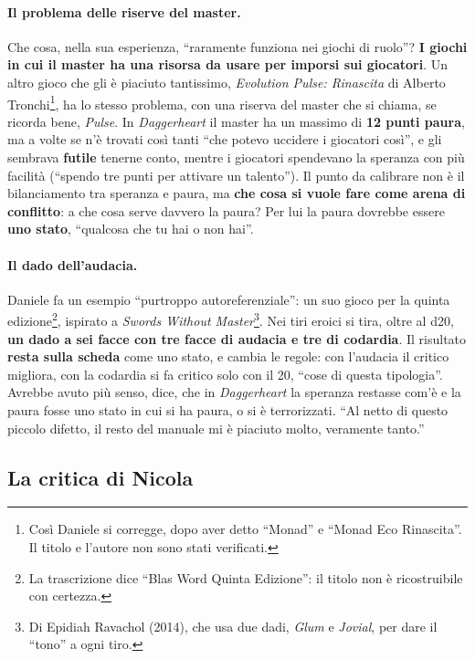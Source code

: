 \paragraph{Il problema delle riserve del master.} Che cosa, nella sua esperienza, ``raramente funziona
nei giochi di ruolo''? \textbf{I giochi in cui il master ha una risorsa da usare per imporsi sui
giocatori}. Un altro gioco che gli è piaciuto tantissimo, \emph{Evolution Pulse: Rinascita} di Alberto
Tronchi\footnote{Così Daniele si corregge, dopo aver detto ``Monad'' e ``Monad Eco Rinascita''. Il titolo
e l'autore non sono stati verificati.}, ha lo stesso problema, con una riserva del master che si chiama,
se ricorda bene, \emph{Pulse}. In \emph{Daggerheart} il master ha un massimo di \textbf{12 punti
paura}, ma a volte se n'è trovati così tanti ``che potevo uccidere i giocatori così'', e gli sembrava
\textbf{futile} tenerne conto, mentre i giocatori spendevano la speranza con più facilità (``spendo tre
punti per attivare un talento''). Il punto da calibrare non è il bilanciamento tra speranza e paura, ma
\textbf{che cosa si vuole fare come arena di conflitto}: a che cosa serve davvero la paura? Per lui la
paura dovrebbe essere \textbf{uno stato}, ``qualcosa che tu hai o non hai''.

\paragraph{Il dado dell'audacia.} Daniele fa un esempio ``purtroppo autoreferenziale'': un suo gioco per
la quinta edizione\footnote{La trascrizione dice ``Blas Word Quinta Edizione'': il titolo non è
ricostruibile con certezza.}, ispirato a \emph{Swords Without Master}\footnote{Di Epidiah Ravachol
(2014), che usa due dadi, \emph{Glum} e \emph{Jovial}, per dare il ``tono'' a ogni tiro.}. Nei tiri
eroici si tira, oltre al d20, \textbf{un dado a sei facce con tre facce di audacia e tre di codardia}.
Il risultato \textbf{resta sulla scheda} come uno stato, e cambia le regole: con l'audacia il critico
migliora, con la codardia si fa critico solo con il 20, ``cose di questa tipologia''. Avrebbe avuto più
senso, dice, che in \emph{Daggerheart} la speranza restasse com'è e la paura fosse uno stato in cui si
ha paura, o si è terrorizzati. ``Al netto di questo piccolo difetto, il resto del manuale mi è piaciuto
molto, veramente tanto.''

\subsection{La critica di Nicola}

